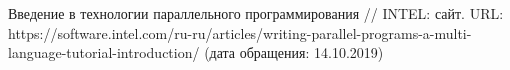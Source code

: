 \documentclass[a4paper,12pt]{article}
\begin{document}
    \begin{center}        
        \begin{thebibliography}{}
        	  Введение в технологии параллельного программирования // INTEL: сайт. URL: https://software.intel.com/ru-ru/articles/writing-parallel-programs-a-multi-language-tutorial-introduction/ (дата обращения: 14.10.2019)            	        	
        \end{thebibliography}
    \end{center}
\end{document}

